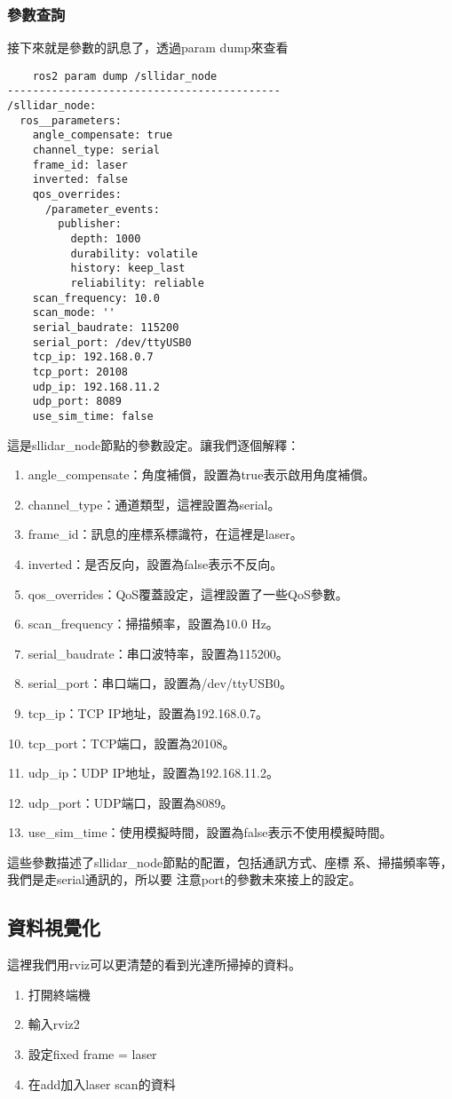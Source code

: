 \subsubsection{參數查詢}
接下來就是參數的訊息了，透過param dump來查看

\begin{tcolorbox}
\begin{verbatim}
    ros2 param dump /sllidar_node
-------------------------------------------
/sllidar_node:
  ros__parameters:
    angle_compensate: true
    channel_type: serial
    frame_id: laser
    inverted: false
    qos_overrides:
      /parameter_events:
        publisher:
          depth: 1000
          durability: volatile
          history: keep_last
          reliability: reliable
    scan_frequency: 10.0
    scan_mode: ''
    serial_baudrate: 115200
    serial_port: /dev/ttyUSB0
    tcp_ip: 192.168.0.7
    tcp_port: 20108
    udp_ip: 192.168.11.2
    udp_port: 8089
    use_sim_time: false
\end{verbatim}
\end{tcolorbox}
這是sllidar\_node節點的參數設定。讓我們逐個解釋：
\begin{enumerate}
    \item angle\_compensate：角度補償，設置為true表示啟用角度補償。
    \item channel\_type：通道類型，這裡設置為serial。
    \item frame\_id：訊息的座標系標識符，在這裡是laser。
    \item inverted：是否反向，設置為false表示不反向。
    \item qos\_overrides：QoS覆蓋設定，這裡設置了一些QoS參數。
    \item scan\_frequency：掃描頻率，設置為10.0 Hz。
    \item serial\_baudrate：串口波特率，設置為115200。
    \item serial\_port：串口端口，設置為/dev/ttyUSB0。
    \item tcp\_ip：TCP IP地址，設置為192.168.0.7。
    \item tcp\_port：TCP端口，設置為20108。
    \item udp\_ip：UDP IP地址，設置為192.168.11.2。
    \item udp\_port：UDP端口，設置為8089。
    \item use\_sim\_time：使用模擬時間，設置為false表示不使用模擬時間。
\end{enumerate}

這些參數描述了sllidar\_node節點的配置，包括通訊方式、座標
系、掃描頻率等，我們是走serial通訊的，所以要
注意port的參數未來接上的設定。

\subsection{資料視覺化}
這裡我們用rviz可以更清楚的看到光達所掃掉的資料。

\begin{enumerate}
    \item 打開終端機
    \item 輸入rviz2
    \item 設定fixed frame = laser
    \item 在add加入laser scan的資料
\end{enumerate}
